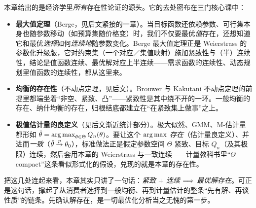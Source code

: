 本章给出的是经济学里\emph{所有}存在性论证的源头。它的去处密布在三门核心课中：

\begin{itemize}
    \item \textbf{最大值定理}（Berge，见后文紧接的一章）。当目标函数还依赖参数、可行集本身也随参数移动（如预算集随价格变）时，我们不仅要最优\emph{值}存在，还想知道它和最优\emph{选择}如何\emph{连续地}随参数变化。Berge 最大值定理正是 Weierstrass 的参数化升级版，它对约束集（一个对应／集值映射）施加紧致性与（半）连续性，结论是值函数连续、最优解对应上半连续——需求函数的连续性、动态规划里值函数的连续性，都从这里来。
    \item \textbf{均衡的存在性}（不动点定理，见后文）。Brouwer 与 Kakutani 不动点定理的前提里都端坐着``非空、紧致、凸''——紧致性是其中绕不开的一环。一般均衡的存在、纳什均衡的存在，归根结底都建立在``在紧致集上做事''之上。
    \item \textbf{极值估计量的良定义}（见后文渐近统计部分）。极大似然、GMM、M-估计量都形如 $\hat\theta=\operatorname*{arg\,max}_{\theta\in\Theta} Q_n(\theta)$。要让这个 $\operatorname*{arg\,max}$ \emph{存在}（估计量良定义）、并进而\emph{一致}（$\hat\theta\overset{p}{\to}\theta_0$），标准做法正是假定参数空间 $\Theta$ 紧致、目标 $Q_n$（及其极限）连续，然后套用本章的 Weierstrass 与一致连续——计量教科书里``$\Theta$ compact''这条看似形式化的假设，兑现的就是本章的存在性。
\end{itemize}

把这几处连起来看，本章其实只讲了一句话：\emph{紧致 $+$ 连续 $\Longrightarrow$ 最优解存在}。可正是这句话，撑起了从消费者选择到一般均衡、再到计量估计的整条``先有解、再谈性质''的链条。先确认解存在，是一切最优化分析当之无愧的第一步。

